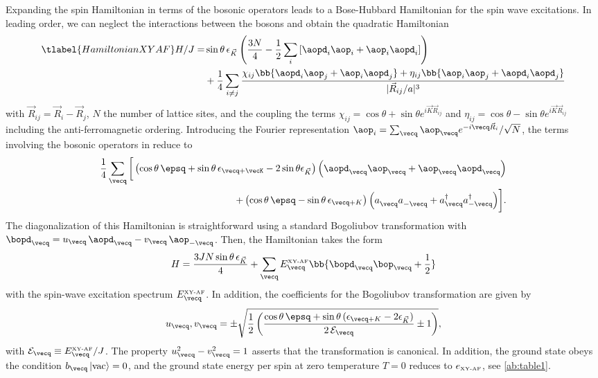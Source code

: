 Expanding the spin Hamiltonian in terms of the bosonic operators leads to a Bose-Hubbard Hamiltonian for the spin wave excitations.
In leading order, we can neglect the interactions between the bosons and obtain the quadratic Hamiltonian
%
\begin{align} \tlabel{HamiltonianXYAF}
H/J = &\sin \theta \, \epsilon_{\vec K} \left(\frac{3 N}{4} - \frac{1}{2}\sum_i\left[\aopd_{i}\aop_i+ \aop_i \aopd_{i}\right]\right) \\
           &+  \frac{1}{4} \sum_{i\ne j} \frac{
    \chi_{i j} \bb{ \aopd_{i} \aop_{j}  + \aop_{i} \aopd_{j} }
  + \eta_{i j} \bb{ \aop_{i} \aop_{j}  + \aopd_{i} \aopd_{j} }
}{|{\vec R}_{ij}/a|^3}
\end{align}
with  ${\vec R}_{ij}={\vec R}_i - {\vec R}_j$,  $N$ the number of lattice sites, and the coupling the terms
$\chi_{i j}=\cos\theta+\sin\theta e^{i {\vec K} {\vec R}_{ij}}$ and $\eta_{i j}=\cos\theta-\sin\theta e^{i {\vec K} {\vec R}_{ij}}$ including the
 anti-ferromagnetic ordering.
Introducing the  Fourier representation $\aop_i =  \sum_{\vecq} \aop_{\vecq}e^{-i {\vecq} {\vec R}_i}/\sqrt{N}$,
the terms involving the bosonic operators in  reduce to
%
\begin{align}
\frac{1}{4} \sum_{\vecq} \bigg[
\left( \cos\theta \, \epsq +\sin\theta \, \epsilon_{\vecq+\vecK} - 2 \sin \theta \epsilon_{\vec K}\right)\Big(\aopd_{\vecq} \aop_{\vecq}  + \aop_{\vecq} \aopd_{\vecq}\Big) \\
+\left( \cos\theta \, \epsq-\sin\theta \, \epsilon_{\vecq+K} \right)\Big(a^{\phantom\dag}_{\vecq} a^{\phantom\dag}_{-\vecq}
+ a^{\dag}_{\vecq} a^{\dag}_{-{\vecq}} \Big) \bigg].
\end{align}
%
The diagonalization of this Hamiltonian is straightforward using a standard Bogoliubov transformation
with $\bopd_{\vecq} = u_{\vecq}\, \aopd_{\vecq} - v_{\vecq}\, \aop_{-\vecq}$.
Then, the Hamiltonian takes the form
%
\begin{align}
H = \frac{3J N \sin \theta\, \epsilon_{\vec K}}{4}  + \sum_{\vecq} E^{\mbox{\tiny XY-AF}}_{\vecq} \bb{\bopd_{\vecq}\bop_{\vecq} + \frac{1}{2}}
\end{align}
%
with the spin-wave excitation spectrum $E^{\mbox{\tiny XY-AF}}_{\vecq}$. In addition, the coefficients  for the Bogoliubov transformation
are given by
%
\begin{align}
u_{\vecq} , v_{\vecq} = \pm\sqrt{\frac{1}{2} \left( \frac{\cos\theta \, \epsq +\sin\theta \, (\epsilon_{\vecq+K} - 2 \epsilon_{\vec K})}{2\, \mathcal{E}_{\vecq}}\pm 1\right)},
\end{align}
%
with $\mathcal{E}_{\vecq} \equiv E^{\mbox{\tiny XY-AF}}_{\vecq} / J $.
The property $u^2_{\vecq}-v^2_{\vecq}=1$ asserts that the transformation is canonical.
In addition, the ground state obeys the condition $b_{\vecq} \left|\text{vac}\right\rangle = 0$, and the ground state energy per spin at zero temperature $T=0$
reduces to $e_{\mbox{\tiny XY-AF}}$, see \cref{ab:table1}.

